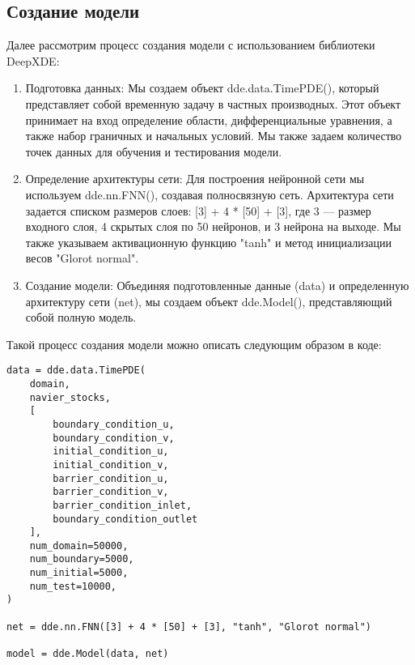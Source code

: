 \subsection{Создание модели}
Далее рассмотрим процесс создания модели с использованием библиотеки DeepXDE:
\begin{enumerate}
    \item Подготовка данных:
    Мы создаем объект dde.data.TimePDE(), который представляет собой временную задачу в частных производных.
    Этот объект принимает на вход определение области, дифференциальные уравнения,
    а также набор граничных и начальных условий.
    Мы также задаем количество точек данных для обучения и тестирования модели.
    \item Определение архитектуры сети:
    Для построения нейронной сети мы используем dde.nn.FNN(), создавая полносвязную сеть.
    Архитектура сети задается списком размеров слоев: [3] + 4 * [50] + [3], где 3 --- размер входного слоя, 4
    скрытых слоя по 50 нейронов, и 3 нейрона на выходе.
    Мы также указываем активационную функцию "tanh" и метод инициализации весов "Glorot normal".
    \item Создание модели:
    Объединяя подготовленные данные (data) и определенную архитектуру сети (net), мы создаем объект dde.Model(),
    представляющий собой полную модель.
\end{enumerate}
Такой процесс создания модели можно описать следующим образом в коде:
\begin{verbatim}
data = dde.data.TimePDE(
    domain,
    navier_stocks,
    [
        boundary_condition_u,
        boundary_condition_v,
        initial_condition_u,
        initial_condition_v,
        barrier_condition_u,
        barrier_condition_v,
        barrier_condition_inlet,
        boundary_condition_outlet
    ],
    num_domain=50000,
    num_boundary=5000,
    num_initial=5000,
    num_test=10000,
)

net = dde.nn.FNN([3] + 4 * [50] + [3], "tanh", "Glorot normal")

model = dde.Model(data, net)    
\end{verbatim}
